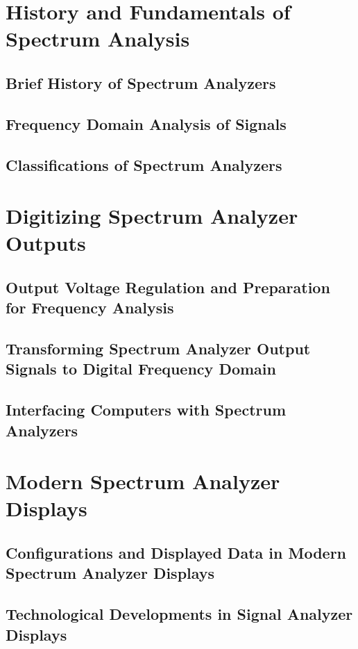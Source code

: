 \documentclass[class=report,11pt,crop=false]{standalone}
\begin{document}
\section{History and Fundamentals of Spectrum Analysis}

\subsection{Brief History of Spectrum Analyzers}

\subsection{Frequency Domain Analysis of Signals}

\subsection{Classifications of Spectrum Analyzers}

\section{Digitizing Spectrum Analyzer Outputs}

\subsection{Output Voltage Regulation and Preparation for Frequency Analysis}

\subsection{Transforming Spectrum Analyzer Output Signals to Digital Frequency Domain}

\subsection{Interfacing Computers with Spectrum Analyzers}

\section{Modern Spectrum Analyzer Displays}

\subsection{Configurations and Displayed Data in Modern Spectrum Analyzer Displays}

\subsection{Technological Developments in Signal Analyzer Displays}
\ifstandalone

\printnoidxglossary[type=\acronymtype,nonumberlist]
\fi
\end{document}
